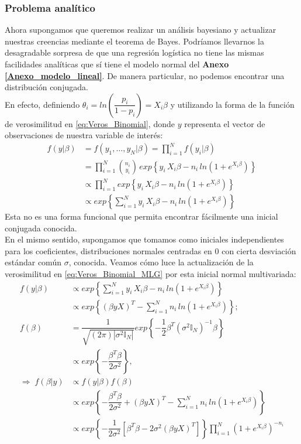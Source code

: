 \subsubsection{Problema analítico} \label{sec:Prob_Analitico}

Ahora supongamos que queremos realizar un análisis bayesiano y actualizar nuestras creencias mediante el teorema de Bayes. Podríamos llevarnos la desagradable sorpresa de que una regresión logística no tiene las mismas facilidades analíticas que sí tiene el modelo normal del \textbf{Anexo \ref{Anexo_modelo_lineal}}. De manera particular, no podemos encontrar una distribución conjugada.\\ 

En efecto, definiendo $\theta_i = ln\left(\dfrac{p_i}{1-p_i}\right)=X_i\beta$ y utilizando la forma de la función de verosimilitud en \eqref{eq:Veros_Binomial}, donde $y$ representa el vector de observaciones de nuestra variable de interés: 
\begin{align} \label{eq:Veros_Binomial_MLG} 
f(y|\beta) &= f(y_1,\dots,y_N|\beta)= \prod_{i=1}^N f(y_i|\beta) \nonumber\\
&= \prod_{i=1}^N {n_i\choose y_i}\,exp\left\lbrace y_i\,X_i\beta-n_i\,ln\left(1+e^{X_i\beta}\right)\right\rbrace \nonumber\\
&\propto \prod_{i=1}^N exp\left\lbrace y_i\,X_i\beta-n_i\,ln\left(1+e^{X_i\beta}\right)\right\rbrace \nonumber\\
&\propto exp\left\lbrace \sum\limits_{i=1}^Ny_i\,X_i\beta-n_i\,ln\left(1+e^{X_i\beta}\right)\right\rbrace 
\end{align}
Esta no es una forma funcional que permita encontrar fácilmente una inicial conjugada conocida.\\

En el mismo sentido, supongamos que tomamos como iniciales independientes para los coeficientes, distribuciones normales centradas en $0$ con cierta desviación estándar común $\sigma$, conocida. Veamos cómo luce la actualización de la verosimilitud en \eqref{eq:Veros_Binomial_MLG} por esta inicial normal multivariada: 
\begin{align*}
f(y|\beta) &\propto exp\left\lbrace \sum\limits_{i=1}^N y_i\,X_i\beta-n_i\,ln\left(1+e^{X_i\beta}\right)\right\rbrace \\
&\propto exp\left\lbrace (\beta yX)^T-\sum\limits_{i=1}^Nn_i\,ln\left(1+e^{X_i\beta}\right)\right\rbrace; \\
f(\beta) &= \dfrac{1}{\sqrt{(2\pi)|\sigma^2 \mathbb{I}_N|}}exp\left\lbrace -\dfrac{1}{2}\beta^T(\sigma^2\mathbb{I}_N)^{-1}\beta\right\rbrace \\
&\propto exp\left\lbrace -\dfrac{\beta^T\beta}{2\sigma^2}\right\rbrace, \\
\Rightarrow \; f(\beta|y)&\propto f(y|\beta)f(\beta) \\
&\propto exp\left\lbrace -\dfrac{\beta^T\beta}{2\sigma^2} + (\beta yX)^T-\sum\limits_{i=1}^Nn_i\,ln\left(1+e^{X_i\beta}\right)\right\rbrace \\
&\propto exp\left\lbrace -\dfrac{1}{2\sigma^2}\left[\beta^T\beta - 2\sigma^2(\beta yX)^T\right]\right\rbrace\prod_{i=1}^N \left(1+e^{X_i\beta}\right)^{-n_i}
\end{align*}

